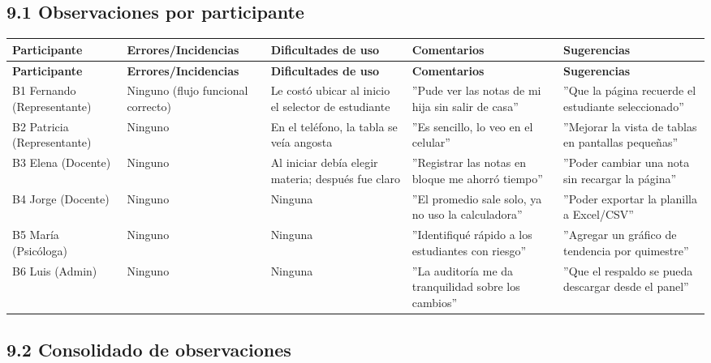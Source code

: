 \documentclass[11pt,a4paper]{article}
\begin{document}
\subsection*{9.1 Observaciones por participante}


{\small
\begin{longtable}{|p{}|p{}|p{}|p{}|p{}|}
\rowcolor{UTECblue}\color{white}\bfseries Participante & \color{white}\bfseries Errores/Incidencias & \color{white}\bfseries Dificultades de uso & \color{white}\bfseries Comentarios & \color{white}\bfseries Sugerencias \\ \hline
\endfirsthead
\rowcolor{UTECblue}\color{white}\bfseries Participante & \color{white}\bfseries Errores/Incidencias & \color{white}\bfseries Dificultades de uso & \color{white}\bfseries Comentarios & \color{white}\bfseries Sugerencias \\ \hline
\endhead
B1 Fernando (Representante) & Ninguno (flujo funcional correcto) & Le costó ubicar al inicio el selector de estudiante & ''Pude ver las notas de mi hija sin salir de casa'' & ''Que la página recuerde el estudiante seleccionado'' \\ \hline
B2 Patricia (Representante) & Ninguno & En el teléfono, la tabla se veía angosta & ''Es sencillo, lo veo en el celular'' & ''Mejorar la vista de tablas en pantallas pequeñas'' \\ \hline
B3 Elena (Docente) & Ninguno & Al iniciar debía elegir materia; después fue claro & ''Registrar las notas en bloque me ahorró tiempo'' & ''Poder cambiar una nota sin recargar la página'' \\ \hline
B4 Jorge (Docente) & Ninguno & Ninguna & ''El promedio sale solo, ya no uso la calculadora'' & ''Poder exportar la planilla a Excel/CSV'' \\ \hline
B5 María (Psicóloga) & Ninguno & Ninguna & ''Identifiqué rápido a los estudiantes con riesgo'' & ''Agregar un gráfico de tendencia por quimestre'' \\ \hline
B6 Luis (Admin) & Ninguno & Ninguna & ''La auditoría me da tranquilidad sobre los cambios'' & ''Que el respaldo se pueda descargar desde el panel'' \\ \hline
\end{longtable}}


\subsection*{9.2 Consolidado de observaciones}
\end{document}

